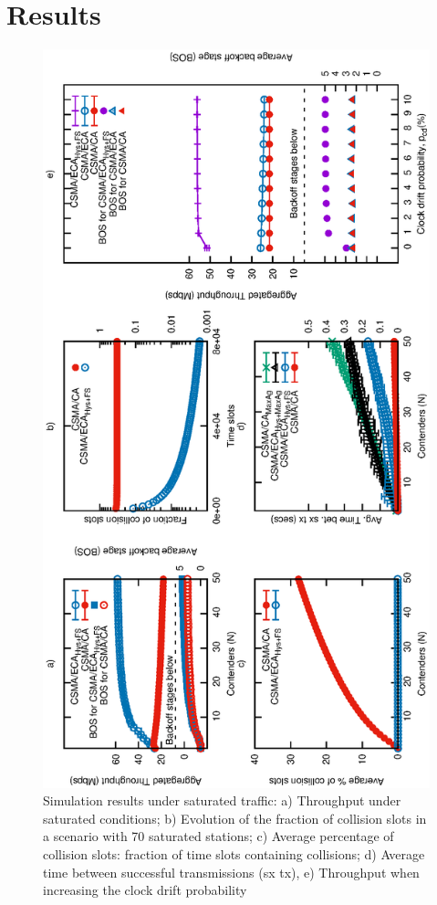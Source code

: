 \section{Results}\label{results}
	\begin{figure}[tb]
		\centering
		\includegraphics[width=0.5\linewidth,angle=-90]{figures/tonFigs/saturation-combined.eps}
		\caption{Simulation results under saturated traffic: a) Throughput under saturated conditions; b) Evolution of the fraction of collision slots in a scenario with 70 saturated stations; c) Average percentage of collision slots: fraction of time slots containing collisions; d) Average time between successful transmissions (sx tx), e) Throughput when increasing the clock drift probability}
		\label{fig:satResults}
	\end{figure}
	
	
